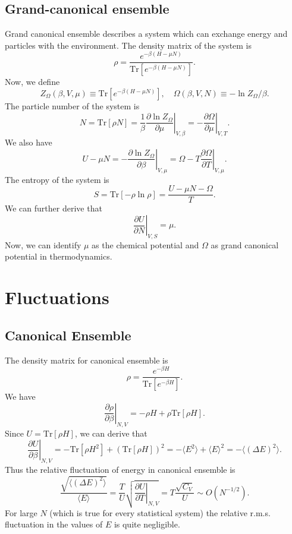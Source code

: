 \subsection{Grand-canonical ensemble}
Grand canonical ensemble describes a system which can exchange energy and particles with the environment. The density matrix of the system is
\[\rho = \frac{e^{-\beta (H - \mu N)}}{\mathrm{Tr}[e^{-\beta (H - \mu N)}]}.\]
Now, we define
\[Z_{\Omega}(\beta,V,\mu) \equiv \mathrm{Tr}[e^{-\beta (H-\mu N)}] , \quad \Omega(\beta,V,N) \equiv -\ln Z_{\Omega}/\beta.\]
The particle number of the system is
\[N = \mathrm{Tr}[\rho N] = \frac{1}{\beta}\left. \frac{\partial \ln Z_{\Omega}}{\partial \mu} \right|_{V,\beta} = -\left. \frac{\partial \Omega}{\partial \mu} \right|_{V,T}.\]
We also have
\[U - \mu N = -\left. \frac{\partial \ln Z_{\Omega}}{\partial \beta} \right|_{V,\mu} = \Omega - T\left. \frac{\partial \Omega}{\partial T} \right|_{V,\mu} .\]
The entropy of the system is
\[S = \mathrm{Tr}[-\rho\ln\rho] = \frac{U-\mu N - \Omega}{T}.\]
We can further derive that
\[\left. \frac{\partial U}{\partial N}\right|_{V,S} = \mu.\]
Now, we can identify $\mu$ as the chemical potential and $\Omega$ as grand canonical potential in thermodynamics.

\section{Fluctuations}
\subsection{Canonical Ensemble}
The density matrix for canonical ensemble is
\[\rho = \frac{e^{-\beta H}}{\mathrm{Tr}[e^{-\beta H}]}.\]
We have
\[\left. \frac{\partial \rho}{\partial \beta} \right|_{N,V} = -\rho H + \rho \mathrm{Tr}[\rho H].\]
Since $U = \mathrm{Tr}[\rho H]$, we can derive that
\[\left. \frac{\partial U}{\partial \beta} \right|_{N,V} = -\mathrm{Tr}[\rho H^2] + (\mathrm{Tr}[\rho H])^2 = -\langle E^2 \rangle + \langle E \rangle^2 = -\langle (\Delta E)^2 \rangle.\]
Thus the relative fluctuation of energy in canonical ensemble is
\[\frac{\sqrt{\langle (\Delta E)^2 \rangle}}{\langle E \rangle} = \frac{T}{U}\sqrt{\left. \frac{\partial U}{\partial T} \right|_{N,V}} = T \frac{\sqrt{C_V}}{U} \sim O(N^{-1/2}).\]
For large $N$ (which is true for every statistical system) the relative r.m.s. fluctuation in the values of $E$ is quite negligible.

